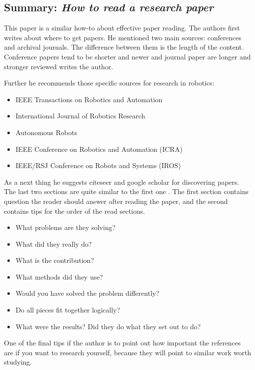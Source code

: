 \documentclass{article}
\begin{document}
\subsection*{Summary: \emph{How to read a research paper}}

This paper \cite{Huang2000} is a similar how-to about effective paper reading.
The authors first writes about where to get papers. He mentioned two main sources: conferences and archival journals. The 
difference between them is the length of the content. Conference papers tend to be shorter and newer and journal paper are longer 
and stronger reviewed writes the author.

Further he recommends those specific sources for research in robotics:  
\begin{itemize}
  \item IEEE Transactions on Robotics and Automation
  \item International Journal of Robotics Research
  \item Autonomous Robots
  \item IEEE Conference on Robotics and Automation (ICRA)
  \item IEEE/RSJ Conference on Robots and Systems (IROS)
\end{itemize}

As a next thing he suggests citeseer and google scholar for discovering papers. The last two sections are quite similar to the first one
\cite{Griswold2009}. The first section contains question the reader should answer after reading the paper, and the second contains
tips for the order of the read sections.
\begin{itemize}
  \item What problems are they solving?
  \item What did they really do?
  \item What is the contribution?
  \item What methods did they use? 
  \item Would you have solved the problem differently?
  \item Do all pieces fit together logically?
  \item What were the results? Did they do what they set out to do?
\end{itemize}
One of the final tips if the author is to point out how important the references are if you want to research yourself, because 
they will point to similar work worth studying.




\end{document}
